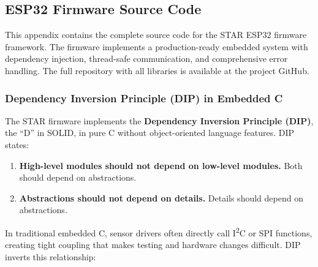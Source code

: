 
\subsection{ESP32 Firmware Source Code}\label{app:firmware-code}

This appendix contains the complete source code for the STAR ESP32 firmware framework. The firmware implements a production-ready embedded system with dependency injection, thread-safe communication, and comprehensive error handling. The full repository with all libraries is available at the project GitHub.

\subsubsection{Dependency Inversion Principle (DIP) in Embedded C}

The STAR firmware implements the \textbf{Dependency Inversion Principle (DIP)}, the ``D'' in SOLID, in pure C without object-oriented language features. DIP states:

\begin{enumerate}
    \item \textbf{High-level modules should not depend on low-level modules.} Both should depend on abstractions.
    \item \textbf{Abstractions should not depend on details.} Details should depend on abstractions.
\end{enumerate}

In traditional embedded C, sensor drivers often directly call I\textsuperscript{2}C or SPI functions, creating tight coupling that makes testing and hardware changes difficult. DIP inverts this relationship:

